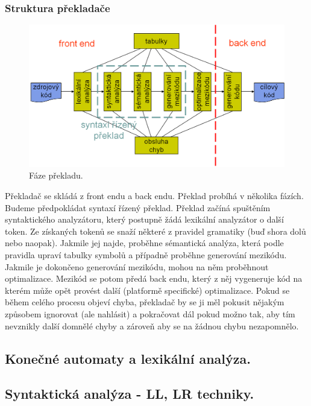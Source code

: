 \subsubsection{Struktura překladače}
\begin{figure}[h]
	\centering
	\includegraphics[width=15cm]{i2/softwarove_inzenyrstvi/obrazky/Faze_prekladu.png}
	\caption{Fáze překladu.}
	\label{pic:Faze_prekladu}
\end{figure}
Překladač se skládá z front endu a back endu. Překlad probíhá v několika fázích. Budeme předpokládat syntaxí řízený překlad. Překlad začíná spuštěním syntaktického analyzátoru, který postupně žádá lexikální analyzátor o další token. Ze získaných tokenů se snaží  některé z pravidel gramatiky (buď shora dolů nebo naopak). Jakmile jej najde, proběhne sémantická analýza, která podle pravidla upraví tabulky symbolů a případně proběhne generování mezikódu. Jakmile je dokončeno generování mezikódu, mohou na něm proběhnout optimalizace. Mezikód se potom předá back endu, který z něj vygeneruje kód na kterém může opět provést další (platformě specifické) optimalizace. Pokud se během celého procesu objeví chyba, překladač by se ji měl pokusit nějakým způsobem ignorovat (ale nahlásit) a pokračovat dál pokud možno tak, aby tím nevznikly další domnělé chyby a zároveň aby se na žádnou chybu nezapomnělo.




\subsection{Konečné automaty a lexikální analýza.}





\subsection{Syntaktická analýza - LL, LR techniky.}

